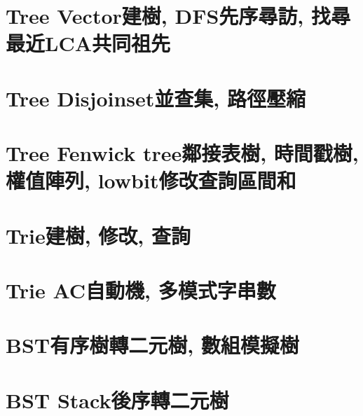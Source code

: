 \documentclass{article}
\begin{document}
\footnotesize \tableofcontents  %
\newpage  %
\begin{multicols}{2}

\section{Tree Vector建樹, DFS先序尋訪, 找尋最近LCA共同祖先}



\section{Tree Disjoinset並查集, 路徑壓縮}



\section{Tree Fenwick tree鄰接表樹, 時間戳樹, 權值陣列, lowbit修改查詢區間和}



\section{Trie建樹, 修改, 查詢}



\section{Trie AC自動機, 多模式字串數}



\section{BST有序樹轉二元樹, 數組模擬樹}



\section{BST Stack後序轉二元樹}


\end{multicols}
\end{document}
